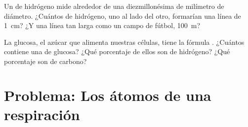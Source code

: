 \begin{exercise}[$\star\star\star$]\label{exo:g7:atoms-and-molecules:11}
Un  de hidrógeno mide alrededor de una diezmillonésima de milímetro
de diámetro. ¿Cuántos  de hidrógeno, uno al lado del otro,
formarían una línea de \qty{1}{cm}? ¿Y una línea tan larga como un campo
de fútbol, \qty{100}{m}?
\end{exercise}

\begin{exercise}[$\star\star\star$]\label{exo:g7:atoms-and-molecules:12}
La glucosa, el azúcar que alimenta nuestras células, tiene la fórmula
. ¿Cuántos  contiene una  de glucosa? ¿Qué
porcentaje de ellos son  de hidrógeno? ¿Qué porcentaje son 
de carbono?
\end{exercise}

\section{Problema: Los átomos de una respiración}

